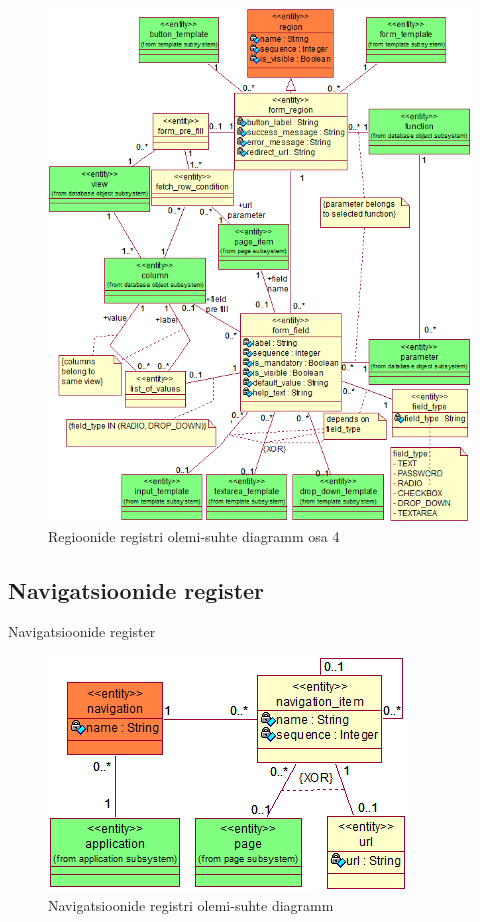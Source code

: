 \documentclass[a4paper,12pt]{article} %
\begin{document}
\begin{figure}[H]
\begin{center}
\includegraphics[bb=0 0 640 776,scale=1]{./diagrams/form-region-er-diagram.png}
\caption{Regioonide registri olemi-suhte diagramm osa 4}
\label{fig_vormide_regioonide_registri_olemi_suhte_diagramm}
\end{center}
\end{figure}

\subsection{Navigatsioonide register}
Navigatsioonide register
\begin{figure}[H]
\begin{center}
\includegraphics[bb=0 0 360 235,scale=1]{./diagrams/navigation-er-diagram.png}
\caption{Navigatsioonide registri olemi-suhte diagramm}
\label{fig_navigatsioonide_registri_olemi_suhte_diagramm}
\end{center}
\end{figure}
\end{document}
